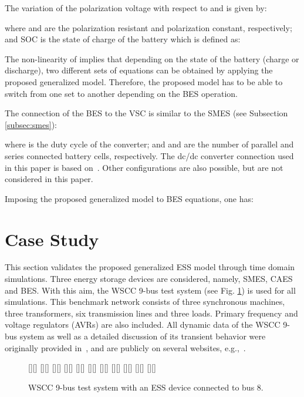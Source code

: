 \documentclass[journal, a4paper]{IEEEtran}
\begin{document}
The variation of the polarization voltage  with respect to
 and  is given by:


where  and  are the polarization resistant and
polarization constant, respectively; and SOC is the state of charge of
the battery which is defined as:


The non-linearity of  implies that depending on the state
of the battery (charge or discharge), two different sets of equations
can be obtained by applying the proposed generalized model.
Therefore, the proposed model has to be able to switch from one set to
another depending on the BES operation.

The connection of the BES to the VSC is similar to the
SMES (see Subsection \ref{subsec:smes}):

where  is the duty cycle of the converter; and  and
 are the number of parallel and series connected battery
cells, respectively. The dc/dc converter connection used in this
  paper is based on~\cite{esmaili:13}.  Other configurations are also
  possible, but are not considered in this paper.

Imposing the proposed generalized model to BES equations, one has:




\section{Case Study}
\label{sec:case}

This section validates the proposed generalized ESS model through time
domain simulations. Three energy storage devices are considered,
namely, SMES, CAES and BES. With this aim, the WSCC 9-bus test system
(see Fig. \ref{9bus}) is used for all simulations.  This benchmark
network consists of three synchronous machines, three transformers,
six transmission lines and three loads.  Primary frequency and voltage
regulators (AVRs) are also included. 
All dynamic data of the WSCC
9-bus system as well as a detailed discussion of its transient
behavior were originally provided in~\cite{Anderson:03}, and 
are publicly on several websites, e.g.,~\cite{web:9bus}.

\begin{figure}[h!]
  \begin{center}
    [][]{\Large }
    [][]{\Large }
    [][]{\Large }
    [][]{\Large }
    [][]{\Large }
    [][]{\Large }
    [][]{\Large }
    [][]{\Large }
    [][]{\Large }
    [][]{\Large }
    [][]{\Large }
    \caption{WSCC 9-bus test system with an ESS device connected to bus 8.}
    \label{9bus}
  \end{center}
\vspace{-0.4cm}
\end{figure}
\end{document}
